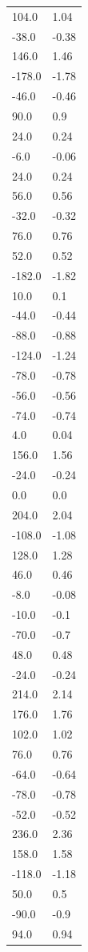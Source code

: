 \begin{longtable}{ll}
104.0 & 1.04 \\
-38.0 & -0.38 \\
146.0 & 1.46 \\
-178.0 & -1.78 \\
-46.0 & -0.46 \\
90.0 & 0.9 \\
24.0 & 0.24 \\
-6.0 & -0.06 \\
24.0 & 0.24 \\
56.0 & 0.56 \\
-32.0 & -0.32 \\
76.0 & 0.76 \\
52.0 & 0.52 \\
-182.0 & -1.82 \\
10.0 & 0.1 \\
-44.0 & -0.44 \\
-88.0 & -0.88 \\
-124.0 & -1.24 \\
-78.0 & -0.78 \\
-56.0 & -0.56 \\
-74.0 & -0.74 \\
4.0 & 0.04 \\
156.0 & 1.56 \\
-24.0 & -0.24 \\
0.0 & 0.0 \\
204.0 & 2.04 \\
-108.0 & -1.08 \\
128.0 & 1.28 \\
46.0 & 0.46 \\
-8.0 & -0.08 \\
-10.0 & -0.1 \\
-70.0 & -0.7 \\
48.0 & 0.48 \\
-24.0 & -0.24 \\
214.0 & 2.14 \\
176.0 & 1.76 \\
102.0 & 1.02 \\
76.0 & 0.76 \\
-64.0 & -0.64 \\
-78.0 & -0.78 \\
-52.0 & -0.52 \\
236.0 & 2.36 \\
158.0 & 1.58 \\
-118.0 & -1.18 \\
50.0 & 0.5 \\
-90.0 & -0.9 \\
94.0 & 0.94 \\

\end{longtable}
